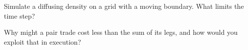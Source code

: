 \begin{interviewq}\label{iq:mx:metaorders-latent-liquidity-and-cross-impact:5}
Simulate a diffusing density on a grid with a moving boundary. What limits the time step?
\end{interviewq}

\begin{interviewq}\label{iq:mx:metaorders-latent-liquidity-and-cross-impact:6}
Why might a pair trade cost less than the sum of its legs, and how would you exploit that in execution?
\end{interviewq}
